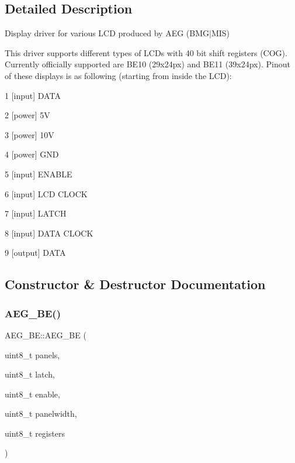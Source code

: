 \subsection{Detailed Description}
Display driver for various L\+CD produced by A\+EG (B\+M\+G$\vert$\+M\+IS) 

This driver supports different types of L\+C\+Ds with 40 bit shift registers (C\+OG). Currently officially supported are B\+E10 (29x24px) and B\+E11 (39x24px). Pinout of these displays is as following (starting from inside the L\+CD)\+:

1 \mbox{[}input\mbox{]} D\+A\+TA

2 \mbox{[}power\mbox{]} 5V

3 \mbox{[}power\mbox{]} 10V

4 \mbox{[}power\mbox{]} G\+ND

5 \mbox{[}input\mbox{]} E\+N\+A\+B\+LE

6 \mbox{[}input\mbox{]} L\+CD C\+L\+O\+CK

7 \mbox{[}input\mbox{]} L\+A\+T\+CH

8 \mbox{[}input\mbox{]} D\+A\+TA C\+L\+O\+CK

9 \mbox{[}output\mbox{]} D\+A\+TA 

\subsection{Constructor \& Destructor Documentation}
\mbox{\label{class_a_e_g___b_e_a85bd3c991a670cf65ed70bca2af49413}} 
\subsubsection{\texorpdfstring{A\+E\+G\+\_\+\+B\+E()}{AEG\_BE()}}
{\footnotesize\ttfamily A\+E\+G\+\_\+\+B\+E\+::\+A\+E\+G\+\_\+\+BE (\begin{DoxyParamCaption}\item[{uint8\+\_\+t}]{panels,  }\item[{uint8\+\_\+t}]{latch,  }\item[{uint8\+\_\+t}]{enable,  }\item[{uint8\+\_\+t}]{panelwidth,  }\item[{uint8\+\_\+t}]{registers }\end{DoxyParamCaption})}



